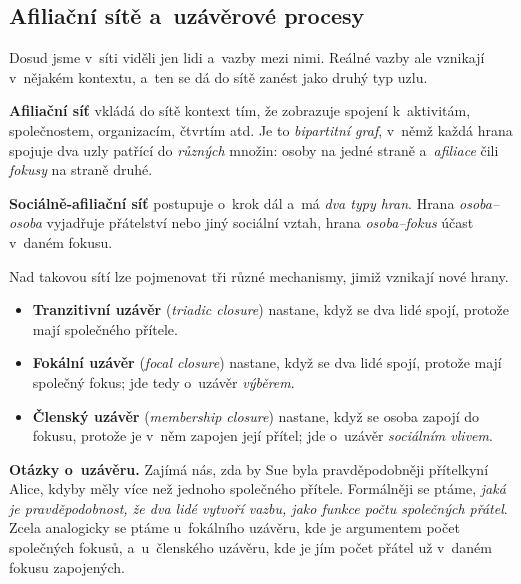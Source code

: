 \documentclass[11pt,a4paper]{article}
\theoremstyle{definition}
\begin{document}
\subsection{Afiliační sítě a~uzávěrové procesy}

Dosud jsme v~síti viděli jen lidi a~vazby mezi nimi. Reálné vazby ale vznikají v~nějakém
kontextu, a~ten se dá do sítě zanést jako druhý typ uzlu.

\begin{defbox}
\textbf{Afiliační síť} vkládá do sítě kontext tím, že zobrazuje spojení k~aktivitám,
společnostem, organizacím, čtvrtím atd. Je to \emph{bipartitní graf}, v~němž každá hrana
spojuje dva uzly patřící do \emph{různých} množin: osoby na jedné straně a~\emph{afiliace}
čili \emph{fokusy} na straně druhé.

\textbf{Sociálně-afiliační síť} postupuje o~krok dál a~má \emph{dva typy hran}. Hrana
\emph{osoba--osoba} vyjadřuje přátelství nebo jiný sociální vztah, hrana \emph{osoba--fokus}
účast v~daném fokusu.
\end{defbox}

Nad takovou sítí lze pojmenovat tři různé mechanismy, jimiž vznikají nové hrany.

\begin{defbox}
\begin{itemize}
\item \textbf{Tranzitivní uzávěr} (\emph{triadic closure}) nastane, když se dva lidé spojí,
      protože mají společného přítele.
\item \textbf{Fokální uzávěr} (\emph{focal closure}) nastane, když se dva lidé spojí, protože
      mají společný fokus; jde tedy o~uzávěr \emph{výběrem}.
\item \textbf{Členský uzávěr} (\emph{membership closure}) nastane, když se osoba zapojí do
      fokusu, protože je v~něm zapojen její přítel; jde o~uzávěr \emph{sociálním vlivem}.
\end{itemize}
\end{defbox}

\textbf{Otázky o~uzávěru.} Zajímá nás, zda by Sue byla pravděpodobněji přítelkyní Alice, kdyby
měly více než jednoho společného přítele. Formálněji se ptáme, \emph{jaká je pravděpodobnost,
že dva lidé vytvoří vazbu, jako funkce počtu společných přátel}. Zcela analogicky se ptáme
u~fokálního uzávěru, kde je argumentem počet společných fokusů, a~u~členského uzávěru, kde je
jím počet přátel už v~daném fokusu zapojených.
\end{document}
